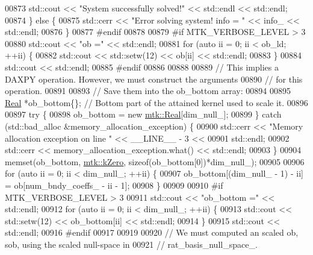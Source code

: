 \begin{DoxyCode}
{{00873       std::cout << \textcolor{stringliteral}{"System successfully solved!"} << std::endl << std::endl;
00874     \} \textcolor{keywordflow}{else} \{
00875       std::cerr << \textcolor{stringliteral}{"Error solving system! info = "} << info\_ << std::endl;
00876     \}
00877 \textcolor{preprocessor}{    #endif}
00878 
00879 \textcolor{preprocessor}{    #if MTK\_VERBOSE\_LEVEL > 3}
00880     std::cout << \textcolor{stringliteral}{"ob ="} << std::endl;
00881     \textcolor{keywordflow}{for} (\textcolor{keyword}{auto} ii = 0; ii < ob\_ld; ++ii) \{
00882       std::cout << std::setw(12) << ob[ii] << std::endl;
00883     \}
00884     std::cout << std::endl;
00885 \textcolor{preprocessor}{    #endif}
00886 
00888 
00889     \textcolor{comment}{// This implies a DAXPY operation. However, we must construct the arguments}
00890     \textcolor{comment}{// for this operation.}
00891 
00893     \textcolor{comment}{// Save them into the ob\_bottom array:}
00894 
00895     \hyperlink{group__c01-roots_gac080bbbf5cbb5502c9f00405f894857d}{Real} *ob\_bottom\{\}; \textcolor{comment}{// Bottom part of the attained kernel used to scale it.}
00896 
00897     \textcolor{keywordflow}{try} \{
00898       ob\_bottom = \textcolor{keyword}{new} \hyperlink{group__c01-roots_gac080bbbf5cbb5502c9f00405f894857d}{mtk::Real}[dim\_null\_];
00899     \} \textcolor{keywordflow}{catch} (std::bad\_alloc &memory\_allocation\_exception) \{
00900       std::cerr << \textcolor{stringliteral}{"Memory allocation exception on line "} << \_\_LINE\_\_ - 3 <<
00901         std::endl;
00902       std::cerr << memory\_allocation\_exception.what() << std::endl;
00903     \}
00904     memset(ob\_bottom, \hyperlink{group__c01-roots_ga59a451a5fae30d59649bcda274fea271}{mtk::kZero}, \textcolor{keyword}{sizeof}(ob\_bottom[0])*dim\_null\_);
00905 
00906     \textcolor{keywordflow}{for} (\textcolor{keyword}{auto} ii = 0; ii < dim\_null\_; ++ii) \{
00907       ob\_bottom[(dim\_null\_ - 1) - ii] = ob[num\_bndy\_coeffs\_ - ii - 1];
00908     \}
00909 
00910 \textcolor{preprocessor}{    #if MTK\_VERBOSE\_LEVEL > 3}
00911     std::cout << \textcolor{stringliteral}{"ob\_bottom ="} << std::endl;
00912     \textcolor{keywordflow}{for} (\textcolor{keyword}{auto} ii = 0; ii < dim\_null\_; ++ii) \{
00913       std::cout << std::setw(12) << ob\_bottom[ii] << std::endl;
00914     \}
00915     std::cout << std::endl;
00916 \textcolor{preprocessor}{    #endif}
00917 
00919 
00920     \textcolor{comment}{// We must computed an scaled ob, sob, using the scaled null-space in}
00921     \textcolor{comment}{// rat\_basis\_null\_space\_.}
}}
\end{DoxyCode}
